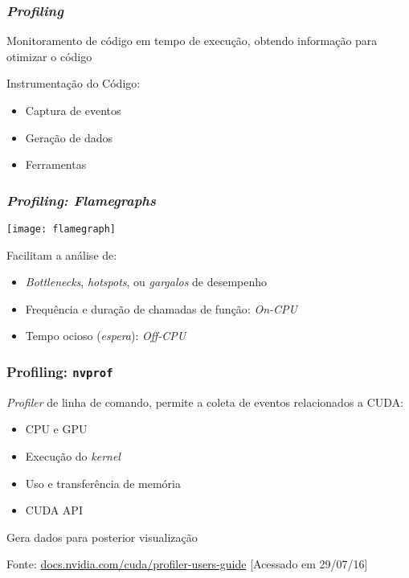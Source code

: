 \documentclass[10pt, compress, aspectratio=43, xcolor={table,usenames,dvipsnames}]{beamer}
\begin{document}
\begin{frame}
    \frametitle{\textit{Profiling}}
    Monitoramento de código \alert{em tempo de execução},
    obtendo informação para \alert{otimizar o código}

    \alert{Instrumentação} do Código:
    \begin{itemize}
        \item Captura de \alert{eventos}
        \item Geração de \alert{dados}
        \item Ferramentas
    \end{itemize}
\end{frame}

\begin{frame}
    \frametitle{\textit{Profiling: Flamegraphs}}
    \begin{center}
        \texttt{[image: flamegraph]}
    \end{center}

    Facilitam a análise de:
    \begin{itemize}
        \item \textit{Bottlenecks}, \textit{hotspots}, ou \textit{gargalos} de desempenho
        \item Frequência e duração de \alert{chamadas de função}: \textit{On-CPU}
        \item Tempo \alert{ocioso} (\textit{espera}): \textit{Off-CPU}
    \end{itemize}
\end{frame}

\begin{frame}
    \frametitle{Profiling: \texttt{nvprof}}
    \textit{Profiler} de \alert{linha de comando},
    permite a coleta de eventos relacionados a CUDA:
    \begin{itemize}
        \item CPU e GPU
        \item Execução do \textit{kernel}
        \item Uso e transferência de memória
        \item CUDA API
    \end{itemize}

    Gera dados para \alert{posterior visualização}

    \begin{center}
        \tiny{Fonte: \url{docs.nvidia.com/cuda/profiler-users-guide} [Acessado em 29/07/16]}
    \end{center}
\end{frame}
\end{document}
